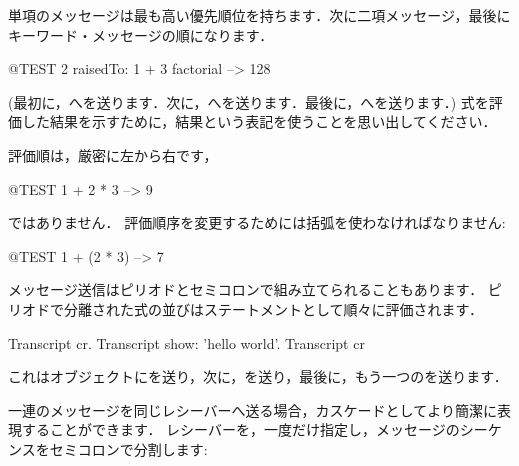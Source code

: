 \documentclass[a4paper,10pt,twoside]{book}
\begin{document}
単項のメッセージは最も高い優先順位を持ちます．次に二項メッセージ，最後にキーワード・メッセージの順になります．
\begin{code}{@TEST}
2 raisedTo: 1 + 3 factorial --> 128
\end{code}
(最初に，へを送ります．次に，へを送ります．最後に，へを送ります．)
式を評価した結果を示すために，\式\ct{-->}結果という表記を使うことを思い出してください．

評価順は，厳密に左から右です，
\begin{code}{@TEST}
1 + 2 * 3 --> 9
\end{code}
ではありません．
評価順序を変更するためには括弧を使わなければなりません:
\begin{code}{@TEST}
1 + (2 * 3) --> 7
\end{code}

メッセージ送信はピリオドとセミコロンで組み立てられることもあります．
ピリオドで分離された式の並びはステートメントとして順々に評価されます．

\begin{code}{}
Transcript cr.
Transcript show: 'hello world'.
Transcript cr
\end{code}

\noindent
これはオブジェクトにを送り，次に，を送り，最後に，もう一つのを送ります．

一連のメッセージを同じレシーバーへ送る場合，カスケードとしてより簡潔に表現することができます．
レシーバーを，一度だけ指定し，メッセージのシーケンスをセミコロンで分割します:
\end{document}
